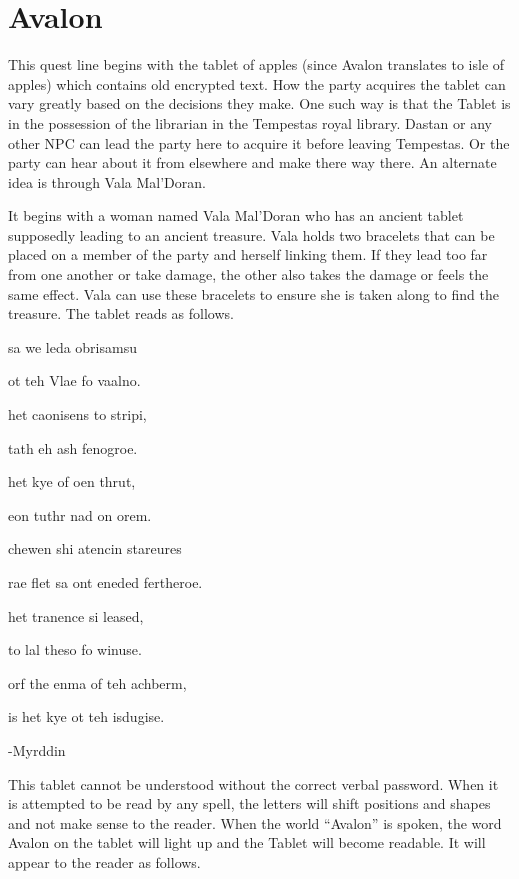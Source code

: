 \section{Avalon}

This quest line begins with the tablet of apples (since Avalon translates to isle of apples) which contains old encrypted text. How the party acquires the tablet can vary greatly based on the decisions they make. One such way is that the Tablet is in the possession of the librarian in the Tempestas royal library. Dastan or any other NPC can lead the party here to acquire it before leaving Tempestas. Or the party can hear about it from elsewhere and make there way there. An alternate idea is through Vala Mal'Doran.

It begins with a woman named Vala Mal'Doran who has an ancient tablet supposedly leading to an ancient treasure. Vala holds two bracelets that can be placed on a member of the party and herself linking them. If they lead too far from one another or take damage, the other also takes the damage or feels the same effect. Vala can use these bracelets to ensure she is taken along to find the treasure. The tablet reads as follows.

\begin{center}
	{ 
		sa we leda obrisamsu  
		
		ot teh Vlae fo vaalno. 
		
		het caonisens to stripi, 
		
		tath eh ash fenogroe. 
		
		het kye of oen thrut, 
		
		eon tuthr nad on orem. 
		
		chewen shi atencin stareures  
		
		rae flet sa ont eneded fertheroe. 
		
		het tranence si leased, 
		
		to lal theso fo winuse. 
		
		orf the enma of teh achberm, 
		
		is het kye ot teh isdugise.
		
		-Myrddin
	}	
\end{center}

This tablet cannot be understood without the correct verbal password. When it is attempted to be read by any spell, the letters will shift positions and shapes and not make sense to the reader. When the world ``Avalon'' is spoken, the word Avalon on the tablet will light up and the Tablet will become readable. It will appear to the reader as follows.

